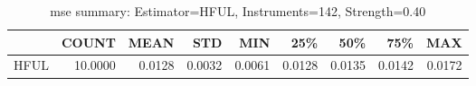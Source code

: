 \begin{table}[ht]
\centering
\caption{mse summary: Estimator=HFUL, Instruments=142, Strength=0.40}
\begin{tabular}{lrrrrrrrr}
\toprule
 & COUNT & MEAN & STD & MIN & 25\% & 50\% & 75\% & MAX \\
\midrule
HFUL & 10.0000 & 0.0128 & 0.0032 & 0.0061 & 0.0128 & 0.0135 & 0.0142 & 0.0172 \\
\bottomrule
\end{tabular}
\end{table}
